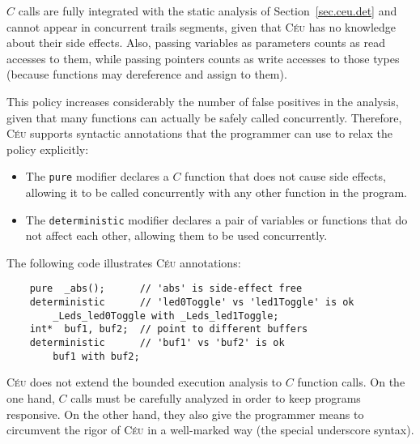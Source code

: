 \documentclass[10pt]{sensys-proc}
\newcommand{\CEU}{\textsc{C\'{e}u}\xspace}
\newcommand{\code}[1] {{\small{\texttt{#1}}}}
\begin{document}
$C$ calls are fully integrated with the static analysis of 
Section~\ref{sec.ceu.det} and cannot appear in concurrent trails segments, 
given that \CEU has no knowledge about their side effects.
Also, passing variables as parameters counts as read accesses to them, while 
passing pointers counts as write accesses to those types (because functions may 
dereference and assign to them).

This policy increases considerably the number of false positives in the 
analysis, given that many functions can actually be safely called concurrently.
Therefore, \CEU supports syntactic annotations that the programmer can use to 
relax the policy explicitly:

\begin{itemize}
\item The \code{pure} modifier declares a $C$ function that does not cause side 
      effects, allowing it to be called concurrently with any other function in 
the program.
\item The \code{deterministic} modifier declares a pair of variables or 
      functions that do not affect each other, allowing them to be used 
concurrently.
\end{itemize}

The following code illustrates \CEU annotations:


{\small
\begin{verbatim}
    pure  _abs();      // 'abs' is side-effect free
    deterministic      // 'led0Toggle' vs 'led1Toggle' is ok
        _Leds_led0Toggle with _Leds_led1Toggle;
    int*  buf1, buf2;  // point to different buffers
    deterministic      // 'buf1' vs 'buf2' is ok
        buf1 with buf2;
\end{verbatim}
}

\begin{comment}
TODO

Annotations are typically write-once declarations (when integrating a $C$ 
service for the first time) to be included in actual applications.
Note that the example in Figure~\ref{lst.blink} should include the annotation 
for \code{\_Leds\_led0Toggle} and \code{\_Leds\_led1Toggle} above to be 
compiled correctly.
\end{comment}

\CEU does not extend the bounded execution analysis to $C$ function calls. 
On the one hand, $C$ calls must be carefully analyzed in order to keep programs 
responsive.
On the other hand, they also give the programmer means to circumvent the rigor 
of \CEU in a well-marked way (the special underscore syntax).
\end{document}
